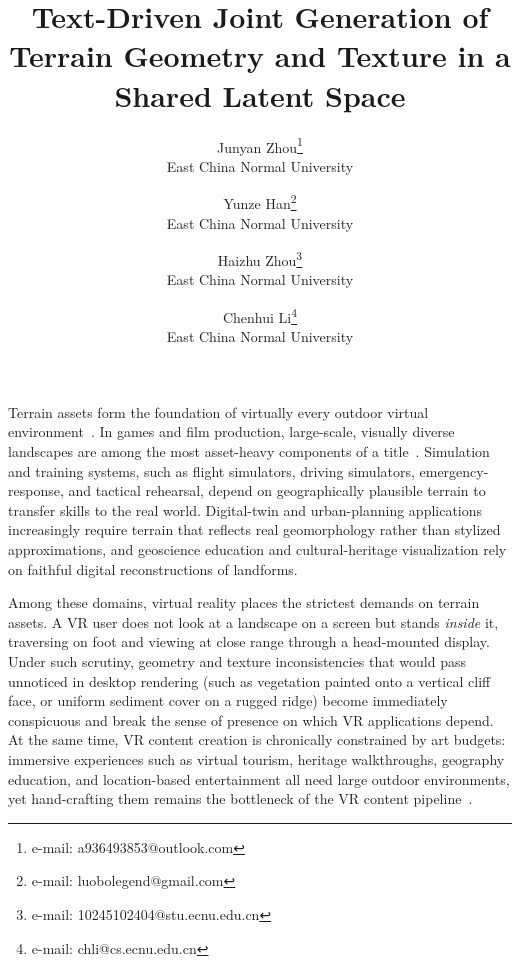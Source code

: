 \documentclass[review]{vgtc}                 %
\title{Text-Driven Joint Generation of Terrain Geometry and Texture in a Shared Latent Space}
\author{
Junyan Zhou\thanks{e-mail: a936493853@outlook.com}\\ %
        \scriptsize East China Normal University %
\and Yunze Han\thanks{e-mail: luobolegend@gmail.com}\\ %
     \scriptsize East China Normal University %
\and Haizhu Zhou\thanks{e-mail: 10245102404@stu.ecnu.edu.cn}\\ %
     \scriptsize East China Normal University %
\and Chenhui Li\thanks{e-mail: chli@cs.ecnu.edu.cn}\\ %
     \scriptsize East China Normal University}
\begin{document}


\maketitle

Terrain assets form the foundation of virtually every outdoor virtual environment~\cite{Perlin:1985}.
In games and film production, large-scale, visually diverse landscapes are among the most asset-heavy components of a title~\cite{TerraFusion:2025}.
Simulation and training systems, such as flight simulators, driving simulators, emergency-response, and tactical rehearsal, depend on geographically plausible terrain to transfer skills to the real world.
Digital-twin and urban-planning applications increasingly require terrain that reflects real geomorphology rather than stylized approximations, and geoscience education and cultural-heritage visualization rely on faithful digital reconstructions of landforms.

Among these domains, virtual reality places the strictest demands on terrain assets.
A VR user does not look at a landscape on a screen but stands \emph{inside} it, traversing on foot and viewing at close range through a head-mounted display.
Under such scrutiny, geometry and texture inconsistencies that would pass unnoticed in desktop rendering (such as vegetation painted onto a vertical cliff face, or uniform sediment cover on a rugged ridge) become immediately conspicuous and break the sense of presence on which VR applications depend.
At the same time, VR content creation is chronically constrained by art budgets: immersive experiences such as virtual tourism, heritage walkthroughs, geography education, and location-based entertainment all need large outdoor environments, yet hand-crafting them remains the bottleneck of the VR content pipeline~\cite{11457501,11459369}.
\end{document}
